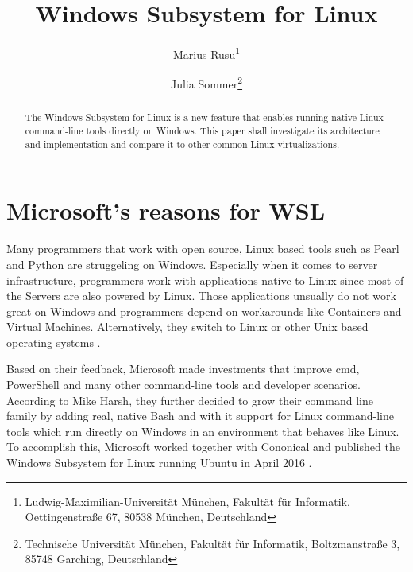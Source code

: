 \documentclass[utf8,biblatex, ngerman, english]{lni}
\begin{document}
\title[WSL]{Windows Subsystem for Linux}
\author[Marius Rusu \and Julia Sommer]
{Marius Rusu\footnote{Ludwig-Maximilian-Universität München, Fakultät für Informatik, Oettingenstraße 67, 80538 München, Deutschland } \and
 Julia Sommer\footnote{Technische Universität München, Fakultät für Informatik, Boltzmanstraße 3, 85748 Garching, Deutschland }}
\maketitle
\newpage
\tableofcontents
\newpage

\begin{abstract}
The Windows Subsystem for Linux is a new feature that enables running native Linux command-line tools directly on Windows. This paper shall investigate its architecture and implementation and compare it to other common Linux virtualizations.
\end{abstract}


\section{Microsoft's reasons for WSL}

Many programmers that work with open source, Linux based tools such as Pearl and Python are struggeling on Windows. Especially when it comes to server infrastructure, programmers work with applications native to Linux since most of the Servers are also powered by Linux. Those applications unsually do not work great on Windows and programmers depend on workarounds like Containers and Virtual Machines. Alternatively, they switch to Linux or other Unix based operating systems \cite{Mi16}.

Based on their feedback, Microsoft made investments that improve cmd, PowerShell and many other command-line tools and developer scenarios. According to Mike Harsh, they further decided to grow their command line family by adding real, native Bash and with it support for Linux command-line tools which run directly on Windows in an environment that behaves like Linux.
To accomplish this, Microsoft worked together with Cononical and published the Windows Subsystem for Linux running Ubuntu in April 2016 \cite{Mi16}.
\end{document}
